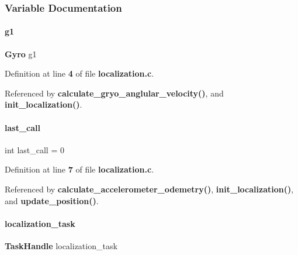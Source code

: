 \subsubsection{Variable Documentation}
\mbox{\label{localization_8c_a46b8f25ffa3bbee071a0468eac654393}} 
\paragraph{g1}
{\footnotesize\ttfamily \textbf{ Gyro} g1\hspace{0.3cm}{\ttfamily [static]}}



Definition at line \textbf{ 4} of file \textbf{ localization.\+c}.



Referenced by \textbf{ calculate\+\_\+gryo\+\_\+anglular\+\_\+velocity()}, and \textbf{ init\+\_\+localization()}.

\mbox{\label{localization_8c_a0f327d31da83831114e7417abb7b6b63}} 
\paragraph{last\+\_\+call}
{\footnotesize\ttfamily int last\+\_\+call = 0\hspace{0.3cm}{\ttfamily [static]}}



Definition at line \textbf{ 7} of file \textbf{ localization.\+c}.



Referenced by \textbf{ calculate\+\_\+accelerometer\+\_\+odemetry()}, \textbf{ init\+\_\+localization()}, and \textbf{ update\+\_\+position()}.

\mbox{\label{localization_8c_a5be50f74f0f5a3aea13f2bd8db891488}} 
\paragraph{localization\+\_\+task}
{\footnotesize\ttfamily \textbf{ Task\+Handle} localization\+\_\+task\hspace{0.3cm}{\ttfamily [static]}}



